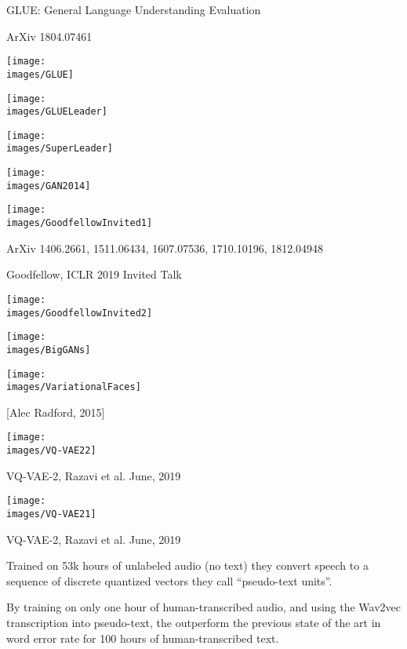 {GLUE: General Language Understanding Evaluation

\vfill

\centerline{\normalsize ArXiv 1804.07461}
\centerline{\texttt{[image: \\images/GLUE]}}


\centerline{\texttt{[image: \\images/GLUELeader]}}


\centerline{\texttt{[image: \\images/SuperLeader]}}

\centerline{\texttt{[image: \\images/GAN2014]}}


\centerline{\texttt{[image: \\images/GoodfellowInvited1]}}

ArXiv 1406.2661, 1511.06434, 1607.07536, 1710.10196, 1812.04948

\centerline{Goodfellow, ICLR 2019 Invited Talk}


\centerline{\texttt{[image: \\images/GoodfellowInvited2]}}


\centerline{\texttt{[image: \\images/BigGANs]}}


\centerline{\texttt{[image: \\images/VariationalFaces]}}
\centerline{[Alec Radford, 2015]}


\centerline{\texttt{[image: \\images/VQ-VAE22]}}

\vfill
VQ-VAE-2, Razavi et al. June, 2019


\centerline{\texttt{[image: \\images/VQ-VAE21]}}

\vfill
VQ-VAE-2, Razavi et al. June, 2019



\vfill
Trained on 53k hours of unlabeled audio (no text) they convert speech to a sequence of discrete quantized vectors they call ``pseudo-text units''.

\vfill
By training on only one hour of human-transcribed audio, and using the Wav2vec transcription into pseudo-text, the outperform the previous state of the
art in word error rate for 100 hours of human-transcribed text.


}
